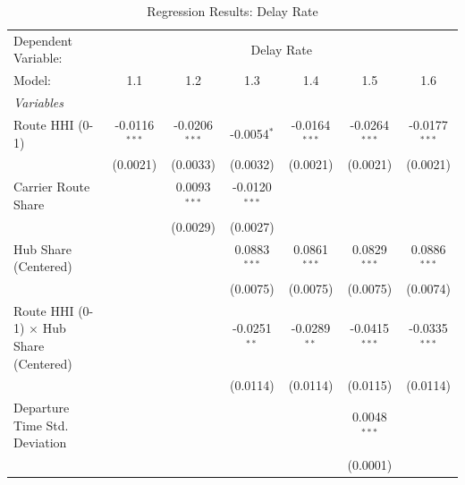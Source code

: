 \documentclass[preprint,12pt,authoryear]{elsarticle}
\begin{document}
\FloatBarrier
\begin{table}[htbp]
   \caption{\label{tab:my_reg_results} Regression Results: Delay Rate}
   \centering
   \small
   \setlength{\tabcolsep}{2pt}
   
   \begin{tabular}{lcccccc}
      \tabularnewline \midrule \midrule
      Dependent Variable: & \multicolumn{6}{c}{Delay Rate}\\
      Model:                            & 1.1             & 1.2             & 1.3             & 1.4             & 1.5             & 1.6 \\  
      \midrule
      \emph{Variables}\\
      Route HHI (0-1)                               & -0.0116$^{***}$ & -0.0206$^{***}$ & -0.0054$^{*}$   & -0.0164$^{***}$ & -0.0264$^{***}$ & -0.0177$^{***}$\\   
                                        & (0.0021)        & (0.0033)        & (0.0032)        & (0.0021)        & (0.0021)        & (0.0021)\\   
      Carrier Route Share                 &                 & 0.0093$^{***}$  & -0.0120$^{***}$ &                 &                 &   \\   
                                        &                 & (0.0029)        & (0.0027)        &                 &                 &   \\   
      Hub Share (Centered)                &                 &                 & 0.0883$^{***}$  & 0.0861$^{***}$  & 0.0829$^{***}$  & 0.0886$^{***}$\\   
                                        &                 &                 & (0.0075)        & (0.0075)        & (0.0075)        & (0.0074)\\   
      Route HHI (0-1) $\times$ Hub Share (Centered)   &                 &                 & -0.0251$^{**}$  & -0.0289$^{**}$  & -0.0415$^{***}$ & -0.0335$^{***}$\\   
                                        &                 &                 & (0.0114)        & (0.0114)        & (0.0115)        & (0.0114)\\   
      Departure Time Std. Deviation                     &                 &                 &                 &                 & 0.0048$^{***}$  &   \\   
                                        &                 &                 &                 &                 & (0.0001)        &   \\   

\end{tabular}
\end{table}
\end{document}

